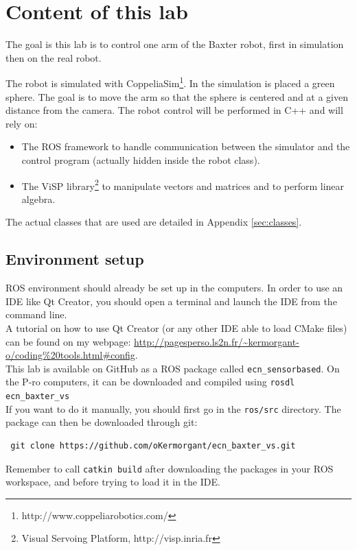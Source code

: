 \documentclass{ecnreport}
\begin{document}


\section{Content of this lab}

The goal is this lab is to control one arm of the Baxter robot, first in simulation then on the real robot. 

The robot is simulated with CoppeliaSim\footnote{http://www.coppeliarobotics.com/}.
In the simulation is placed a green sphere. The goal is to move the arm so that the sphere is centered and at a given distance from the camera.
The robot control will be performed in C++ and will rely on:

\begin{itemize}
 \item The ROS framework to handle communication between the simulator and the control program (actually hidden inside the robot class).
 \item The ViSP library\footnote{Visual Servoing Platform, http://visp.inria.fr} to manipulate vectors and matrices and to perform linear algebra.
\end{itemize}
The actual classes that are used are detailed in Appendix \ref{sec:classes}.\\

\subsection{Environment setup}

ROS environment should already be set up in the computers. 
In order to use an IDE like Qt Creator, you should open a terminal and launch the IDE from the command line.\\ A tutorial on how to use Qt Creator (or any other IDE 
able to load CMake files) can be found on my webpage: \url{http://pagesperso.ls2n.fr/~kermorgant-o/coding\%20tools.html#config}.\\

This lab is available on GitHub as a ROS package called \texttt{ecn\_sensorbased}. 
On the P-ro computers, it can be downloaded and compiled using \texttt{rosdl ecn\_baxter\_vs}\\

If you want to do it manually, you should first go in the \texttt{ros/src} directory. The package can then be downloaded through git:
\begin{center}\cppstyle
\begin{lstlisting}
 git clone https://github.com/oKermorgant/ecn_baxter_vs.git
\end{lstlisting}
\end{center}
Remember to call {\tt{catkin build}} after downloading the packages in your ROS workspace, and before trying to load it in the IDE.
\end{document}
